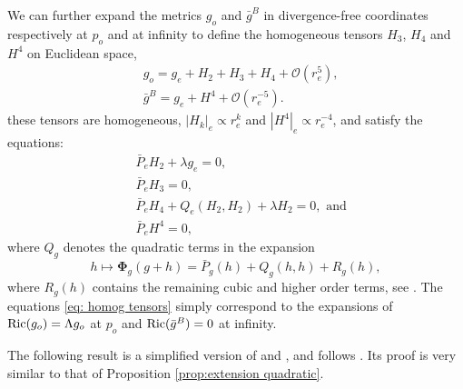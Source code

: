 \documentclass[11pt,reqno]{amsart}
\numberwithin{equation}{section}
\newcommand{\Ric}{{\rm Ric}}
\theoremstyle{definition}
\theoremstyle{remark}
\begin{document}
We can further expand the metrics $g_o$ and $\bar{g}^B$ in divergence-free coordinates respectively at $p_o$ and at infinity to define the homogeneous tensors $H_3$, $H_4$ and $H^4$ on Euclidean space, 
\begin{equation}
\begin{aligned}
    &g_o = g_{e} + H_2+H_3+H_4+\mathcal{O}(r_e^5),\\
    &\bar{g}^B = g_{e}+H^4+\mathcal{O}(r_e^{-5}).
\end{aligned}
\end{equation}
these tensors are homogeneous, $|H_k|_e\propto r_e^k$ and $|H^4|_e\propto r_e^{-4}$, and satisfy the equations:
\begin{equation}\label{eq: homog tensors}
    \begin{aligned}
    &\bar{P}_{e} H_2 + \lambda g_{e} = 0,\\
    &\bar{P}_{e} H_3  = 0,\\
    &\bar{P}_{e} H_4 + Q_{e}(H_2,H_2)+ \lambda H_2 = 0, \text{ and}\\
    &\bar{P}_{e} H^4 = 0,
\end{aligned}
\end{equation}
where $Q_g$ denotes the quadratic terms in the expansion $$h\mapsto \mathbf{\Phi}_g(g+h) = \bar{P}_g(h) + Q_g(h,h) + R_g(h),$$
where $R_g(h)$ contains the remaining cubic and higher order terms, see \cite[Section 14]{biq1}. The equations \eqref{eq: homog tensors} simply correspond to the expansions of $\Ric(g_o) = \Lambda g_o$ at $p_o$ and $\Ric(\bar{g}^B)=0$ at infinity.

The following result is a simplified version of \cite[Sections 2.1.1 and 2.1.2]{ozu3} and \cite[Proposition 11.10] {do3}, and follows \cite[Section 14]{biq1}. Its proof is very similar to that of Proposition \ref{prop:extension quadratic}.
\end{document}
